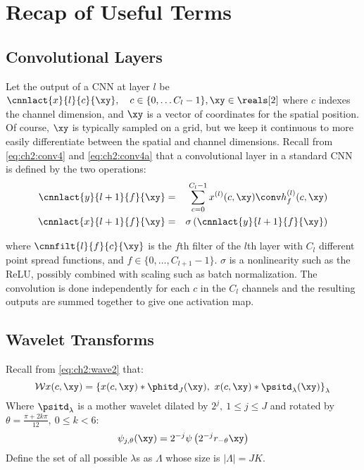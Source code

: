 \section{Recap of Useful Terms}\label{sec:ch5:background}

\subsection{Convolutional Layers}\label{sec:ch5:conv}

Let the output of a CNN at layer $l$ be 
$ \cnnlact{x}{l}{c}{\xy}, \quad c\in \{0, \ldots C_l-1\}, \xy \in \reals[2]$
where $c$ indexes the channel dimension, and $\xy$ is a vector of coordinates
for the spatial position. Of course, $\xy$ is typically sampled on a grid, but
we keep it continuous to more easily differentiate between the spatial and
channel dimensions. Recall from \eqref{eq:ch2:conv4} and \eqref{eq:ch2:conv4a} that
a convolutional layer in a standard CNN is defined by the two operations:
%
\begin{eqnarray} 
  \cnnlact{y}{l+1}{f}{\xy} &=& \sum_{c=0}^{C_l - 1}  x^{(l)}(c,\xy) \conv h^{(l)}_{f}(c, \xy)
    \label{eq:ch5:conv}\\
    \cnnlact{x}{l+1}{f}{\xy} & = & \sigma \left( \cnnlact{y}{l+1}{f}{\xy} \right) \label{eq:ch5:nonlin}
\end{eqnarray}

where $\cnnfilt{l}{f}{c}{\xy}$ is the $f$th filter of the $l$th layer with $C_l$
different point spread functions, and $f \in \{0, \ldots, C_{l+1}-1 \}$. $\sigma$ is a nonlinearity 
such as the ReLU, possibly combined with scaling such as batch normalization. The convolution
is done independently for each $c$ in the $C_l$ channels and the resulting outputs are
summed together to give one activation map. 

\subsection{Wavelet Transforms}\label{sec:ch5:wavelets}
Recall from \eqref{eq:ch2:wave2} that:
\begin{equation}
  \mathcal{W}x(c, \xy) = \left\{x(c, \xy) \ast \phitd_J(\xy),\ x(c, \xy) \ast \psitd_{\lambda}(\xy) \right\}_{\lambda} \label{eq:ch5:wave2}
\end{equation}
Where $\psitd_\lambda$ is a mother wavelet dilated by $2^j,\ 1 \leq j \leq J$ and rotated by
$\theta = \frac{\pi + 2k\pi}{12},\ 0\leq k < 6$:
%
\begin{equation}
  \psi_{j, \theta}(\xy) = 2^{-j}\psi \left(2^{-j} r_{-\theta} \xy\right)
\end{equation}
Define the set of all possible $\lambda$s as $\Lambda$ whose size is $|\Lambda | = JK$.
%
